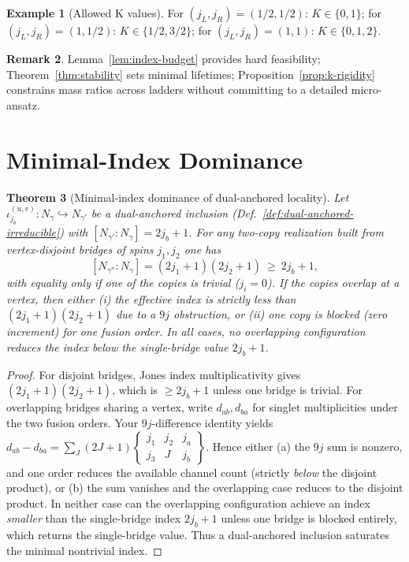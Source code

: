 \documentclass[11pt]{article}
\newcommand{\Index}[2]{\left[#1:#2\right]}
\theoremstyle{plain}
\newtheorem{theorem}{Theorem}[section]
\theoremstyle{definition}
\newtheorem{remark}[theorem]{Remark}
\newtheorem{example}[theorem]{Example}
\begin{document}
\begin{example}[Allowed K values]
  For $(j_L, j_R) = (1/2, 1/2)$: $K \in \{0, 1\}$; for $(j_L, j_R) = (1, 1/2)$: $K \in \{1/2, 3/2\}$; for $(j_L, j_R) = (1, 1)$: $K \in \{0, 1, 2\}$.
\end{example}

\begin{remark}
  Lemma~\ref{lem:index-budget} provides hard feasibility; Theorem~\ref{thm:stability} sets minimal lifetimes; Proposition~\ref{prop:k-rigidity} constrains mass ratios across ladders without committing to a detailed micro-ansatz.
\end{remark}

\section{Minimal-Index Dominance}
\label{sec:minimality}

\begin{theorem}[Minimal-index dominance of dual-anchored locality]\label{thm:min-index-dominance}
  Let $\iota^{(u,v)}_{j_b}:N_\gamma\hookrightarrow N_{\gamma'}$ be a dual-anchored inclusion (Def.~\ref{def:dual-anchored-irreducible}) with $\Index{N_{\gamma'}}{N_\gamma}=2j_b+1$.
  For any two-copy realization built from vertex-disjoint bridges of spins $j_1,j_2$ one has
  \[
    \Index{N_{\gamma''}}{N_\gamma} = (2j_1+1)(2j_2+1)\ \ge\ 2j_b+1,
  \]
  with equality only if one of the copies is trivial ($j_i=0$). If the copies overlap at a vertex, then either (i) the effective index is strictly less than $(2j_1+1)(2j_2+1)$ due to a $9j$ obstruction, or (ii) one copy is blocked (zero increment) for one fusion order. In all cases, no overlapping configuration reduces the index below the single-bridge value $2j_b+1$.
\end{theorem}

\begin{proof}
  For disjoint bridges, Jones index multiplicativity gives $(2j_1+1)(2j_2+1)$, which is $\ge 2j_b+1$ unless one bridge is trivial. For overlapping bridges sharing a vertex, write $d_{ab}, d_{ba}$ for singlet multiplicities under the two fusion orders. Your $9j$-difference identity yields
  \(
    d_{ab}-d_{ba} = \sum_J (2J+1)
    \begin{Bmatrix} j_1 & j_2 & j_a \\ j_3 & J & j_b
    \end{Bmatrix}.
  \)
  Hence either (a) the $9j$ sum is nonzero, and one order reduces the available channel count (strictly \emph{below} the disjoint product), or (b) the sum vanishes and the overlapping case reduces to the disjoint product. In neither case can the overlapping configuration achieve an index \emph{smaller} than the single-bridge index $2j_b+1$ unless one bridge is blocked entirely, which returns the single-bridge value. Thus a dual-anchored inclusion saturates the minimal nontrivial index.
\end{proof}
\end{document}
